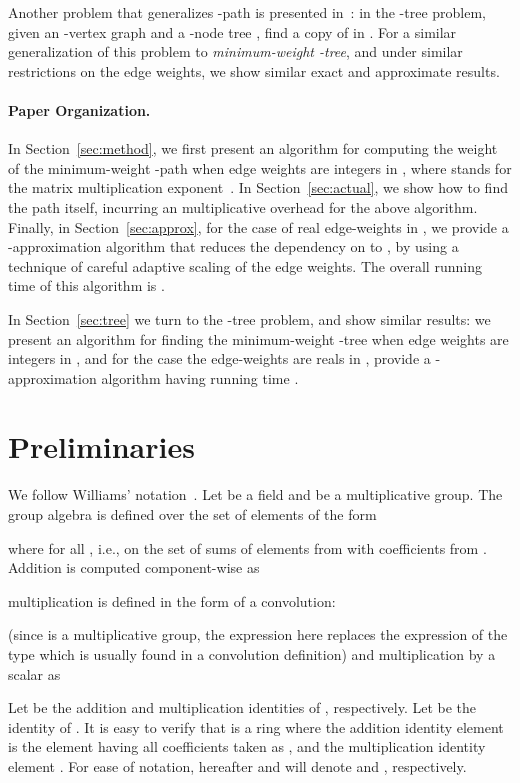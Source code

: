 \documentclass{llncs}
\begin{document}
Another problem that generalizes -path is presented in~\cite{KW09}: in the -tree problem, given an -vertex graph  and a -node tree , find a copy of  in . For a similar generalization of this problem to \emph{minimum-weight -tree}, and under similar restrictions on the edge weights, we show similar exact and approximate results.
\paragraph{Paper Organization.}
In Section~\ref{sec:method}, we first present an  algorithm for computing the weight of the minimum-weight -path when edge weights are integers in , where  stands for the matrix multiplication exponent~\cite{Williams12}. In Section~\ref{sec:actual}, we show how to find the path itself, incurring an  multiplicative overhead for the above algorithm. Finally, in Section~\ref{sec:approx}, for the case of real edge-weights in , we provide a -approximation algorithm that reduces the dependency on  to , by using a technique of careful adaptive scaling of the edge weights. The overall running time of this algorithm is . 

In Section~\ref{sec:tree} we turn to the -tree problem, and show similar results: we present an  algorithm for finding the minimum-weight -tree when edge weights are integers in , and for the case the edge-weights are reals in , provide a -approximation algorithm having running time . 


\section{Preliminaries}\label{sec:prelim}
We follow Williams' notation~\cite{Williams09}. Let  be a field and  be a multiplicative group. The group algebra  is defined over the set of elements of the form

where  for all , i.e., on the set of sums of elements from  with coefficients from . 
Addition is computed component-wise as

multiplication is defined in the form of a convolution:

(since  is a multiplicative group, the expression  here replaces the expression of the type  which is usually found in a convolution definition) and multiplication by a scalar  as


Let  be the addition and multiplication identities of , respectively. Let  be the identity of . It is easy to verify that  is a ring where the addition identity element  is the element having all coefficients taken as , and the multiplication identity element . For ease of notation, hereafter  and  will denote  and , respectively.
\end{document}
